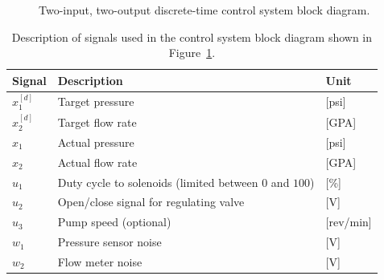 \begin{figure}
  \caption[Two-input, two-output discrete-time control system block diagram.]{Two-input, two-output discrete-time control system block diagram.}
  \label{fig:twoInputTwoOutputDT-ControlSystem}
\end{figure}
%
\begin{table}
  \centering
  \caption{Description of signals used in the control system block diagram shown in Figure~\ref{fig:twoInputTwoOutputDT-ControlSystem}.}
  \label{tab:signalDescription}
  \begin{tabular}{lll}
    \toprule[1.5pt]
    Signal& Description& Unit\\
    \toprule
    $x_1^{[d]}$ & Target pressure & [psi]\\
    $x_2^{[d]}$ & Target flow rate& [GPA]\\
    $x_1$ & Actual pressure & [psi]\\
    $x_2$ & Actual flow rate& [GPA]\\
    $u_1$ & Duty cycle to solenoids (limited between $0$ and $100$)& [\%]\\
    $u_2$ & Open/close signal for regulating valve& [V]\\
    $u_3$ & Pump speed (optional)& [rev/min]\\
    $w_1$ & Pressure sensor noise& [V]\\
    $w_2$ & Flow meter noise& [V]\\
    \bottomrule[1.5pt]
  \end{tabular}
\end{table}
